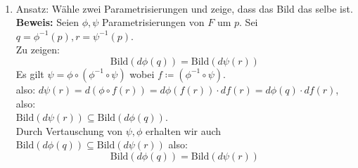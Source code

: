 \begin{solution}
  \
  \begin{enumerate}[label=(\alph*)]
    \item Ansatz: Wähle zwei Parametrisierungen und zeige, dass das Bild das selbe ist. \\
    \textbf{Beweis:} Seien \( \phi, \psi \) Parametrisierungen von \( F \) um \( p \). Sei \( q=\phi^{-1}(p), r=\psi^{-1}(p). \) \\
    Zu zeigen:
    \begin{equation*}
      \text{Bild}(d \phi(q)) = \text{Bild}(d \psi(r))
    \end{equation*}
    Es gilt \( \psi = \phi \circ (\phi^{-1} \circ \psi) \) wobei \( f \coloneqq (\phi^{-1} \circ \psi) \). \\
    also: \( d \psi(r) = d (\phi \circ f(r)) = d \phi(f(r)) \cdot df(r) = d \phi(q) \cdot df(r) \), also: \\
    \( \text{Bild}(d \psi(r)) \subseteq \text{Bild}(d\phi(q)) \). \\
    Durch Vertauschung von \( \psi ,\phi \) erhalten wir auch \( \text{Bild}(d\phi(q)) \subseteq \text{Bild}(d \psi(r)) \) also: 
    \begin{equation*}
      \text{Bild}(d\phi(q)) = \text{Bild}(d \psi(r))
    \end{equation*}


\end{enumerate}
\end{solution}
